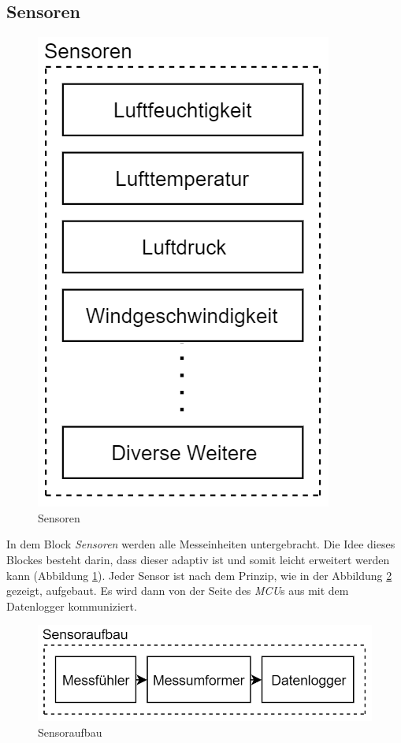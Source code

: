 \newpage
\subsection{Sensoren}
\begin{figure}[h]
\centering
\includegraphics[scale=0.8]{graphics/Sensoren.PNG}
\caption{Sensoren}
\label{fig:sensoren}
\end{figure}
In dem Block \textit{Sensoren} werden alle Messeinheiten untergebracht. Die Idee dieses Blockes besteht darin, dass dieser adaptiv ist und somit leicht erweitert werden kann (Abbildung \ref{fig:sensoren}). Jeder Sensor ist nach dem Prinzip, wie in der Abbildung \ref{fig:sensoraufbau} gezeigt, aufgebaut. Es wird dann von der Seite des \textit{MCU}s aus mit dem Datenlogger kommuniziert.\\

\begin{figure}[h]
\centering
\includegraphics[scale=0.7]{graphics/Sensoraufbau.PNG}
\caption{Sensoraufbau}
\label{fig:sensoraufbau}
\end{figure}

